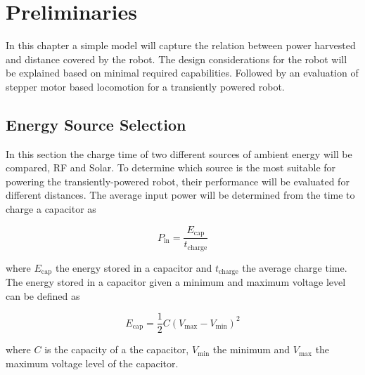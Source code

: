 \chapter{Preliminaries}

In this chapter a simple model will capture the relation between power harvested and distance covered by the robot.
The design considerations for the robot will be explained based on minimal required capabilities. 
Followed by an evaluation of stepper motor based locomotion for a transiently powered robot.

\section{Energy Source Selection}

In this section the charge time of two different sources of ambient energy will be compared, RF and Solar.
To determine which source is the most suitable for powering the transiently-powered robot, their performance will be evaluated for different distances.
The average input power will be determined from the time to charge a capacitor as

\begin{equation}
	P_{\text{in}} = \frac{E_{\text{cap}}}{t_{\text{charge}}}
\end{equation}

\noindent
where $E_{\text{cap}}$ the energy stored in a capacitor and $t_{\text{charge}}$ the average charge time.
The energy stored in a capacitor given a minimum and maximum voltage level can be defined as

\begin{equation}
\label{eqn:energy_cap}
	E_{\text{cap}} = \frac{1}{2}C(V_{\max} - V_{\min})^{2}
\end{equation}

\noindent
where $C$ is the capacity of a the capacitor, $V_{\min}$ the minimum and $V_{\max}$ the maximum voltage level of the capacitor.

